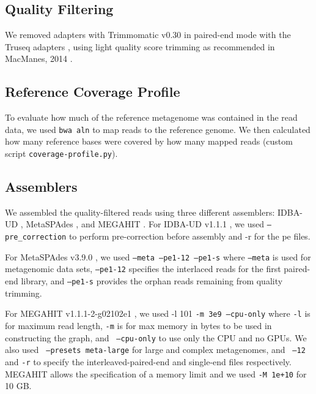 \documentclass[10pt,a4paper,twocolumn]{article}
\begin{document}
\subsection*{Quality Filtering} 

We removed adapters with Trimmomatic v0.30 in paired-end mode with the
Truseq adapters \cite{trimmomatic}, using light quality score trimming
as recommended in MacManes, 2014 \cite{macmanes2014optimal}.


\subsection*{Reference Coverage Profile}

To evaluate how much of the reference metagenome was contained in the read
data, we used {\tt bwa aln} to map reads to the reference genome.  We then
calculated how many reference bases were covered by how many mapped
reads (custom script {\tt coverage-profile.py}).

\subsection*{Assemblers}
We assembled the quality-filtered reads using three different assemblers: IDBA-UD
\cite{idba}, MetaSPAdes \cite{spades}, and MEGAHIT \cite{megahit}.  For
IDBA-UD v1.1.1 \cite{idba}, we used {\tt {--pre\_correction}} to
perform pre-correction before assembly and -r for the pe files.

For MetaSPAdes v3.9.0 \cite{spades}, we used { \tt {--meta --pe1-12
    --pe1-s}} where {\tt{--meta}} is used for
metagenomic data sets, {\tt{--pe1-12}} specifies the interlaced reads
for the first paired-end library, and {\tt{--pe1-s}} provides the
orphan reads remaining from quality trimming.

For MEGAHIT v1.1.1-2-g02102e1 \cite{megahit}, we used -l 101 {\tt{-m 3e9
    --cpu-only}} where {\tt -l} is for maximum read length, {\tt -m} is
for max memory in bytes to be used in constructing the graph, and {\tt
  {--cpu-only}} to use only the CPU and no GPUs. We also used {\tt
  {--presets meta-large}} for large and complex metagenomes, and {\tt
  {--12} } and {\tt{-r}} to specify the
interleaved-paired-end and single-end files respectively.  MEGAHIT allows
the specification of a memory limit and we used {\tt -M 1e+10} for 10 GB.
\end{document}
